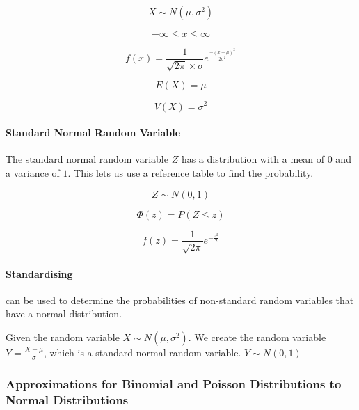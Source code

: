 \documentclass[12pt]{article}
\begin{document}
	\begin{equation*}
		X\sim N(\mu,\sigma ^2)
	\end{equation*}
	
	\begin{equation*}
		-\infty \leq x\leq \infty
	\end{equation*}
	
	\begin{equation*}
		f(x)=\frac{1}{\sqrt{2\pi}\times \sigma}e^{\frac{-(x-\mu)^2}{2\sigma ^2}}
	\end{equation*}
	
	\begin{equation*}
		E(X)=\mu
	\end{equation*}
	
	\begin{equation*}
		V(X)=\sigma ^2
	\end{equation*}
	
	\paragraph{Standard Normal Random Variable}
	
	\noindent The standard normal random variable \(Z\) has a distribution with a mean of \(0\) and a variance of \(1\). This lets us use a reference table to find the probability.
	
	\begin{equation*}
		Z\sim N(0,1)
	\end{equation*}
	
	\begin{equation*}
		\Phi (z) = P(Z\leq z)
	\end{equation*}
	
	\begin{equation*}
		f(z)=\frac{1}{\sqrt{2\pi}}e^{-\frac{z^2}{2}}
	\end{equation*}
	
	\paragraph{Standardising}
	
	can be used to determine the probabilities of non-standard random variables that have a normal distribution.
	
	\noindent Given the random variable \(X\sim N(\mu , \sigma ^2)\). We create the random variable \(Y=\frac{X-\mu}{\sigma}\), which is a standard normal random variable. \(Y\sim N(0,1)\)
	
	\subsubsection{Approximations for Binomial and Poisson Distributions to Normal Distributions}
	
\end{document}
